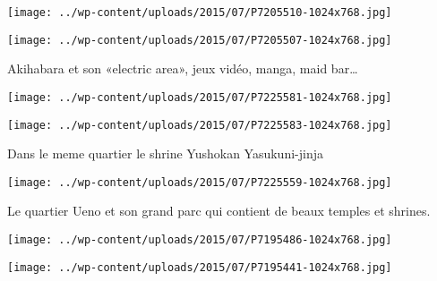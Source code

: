  

 

\begin{center} \texttt{[image: ../wp-content/uploads/2015/07/P7205510-1024x768.jpg]} \end{center}

 

 

\begin{center} \texttt{[image: ../wp-content/uploads/2015/07/P7205507-1024x768.jpg]} \end{center}

 

 Akihabara et son «electric area», jeux vidéo, manga, maid bar… 

 

\begin{center} \texttt{[image: ../wp-content/uploads/2015/07/P7225581-1024x768.jpg]} \end{center}

 

 

\begin{center} \texttt{[image: ../wp-content/uploads/2015/07/P7225583-1024x768.jpg]} \end{center}

 

 Dans le meme quartier le shrine Yushokan Yasukuni-jinja 

 

\begin{center} \texttt{[image: ../wp-content/uploads/2015/07/P7225559-1024x768.jpg]} \end{center}

 

 Le quartier Ueno et son grand parc qui contient de beaux temples et shrines. 

 

\begin{center} \texttt{[image: ../wp-content/uploads/2015/07/P7195486-1024x768.jpg]} \end{center}

 

 

\begin{center} \texttt{[image: ../wp-content/uploads/2015/07/P7195441-1024x768.jpg]} \end{center}

 

